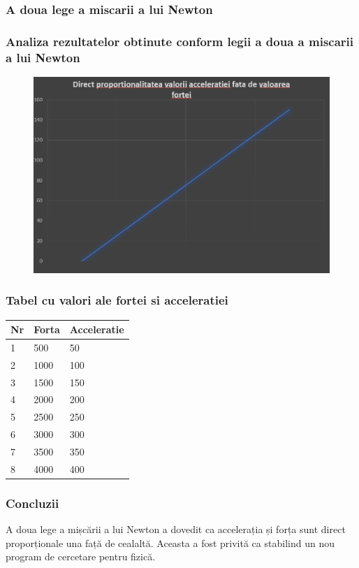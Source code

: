 \documentclass{beamer}
\begin{document}
\begin{frame}
\frametitle{A doua lege a miscarii a lui Newton}
\end{frame}

\begin{frame}
\frametitle{ Analiza rezultatelor obtinute conform legii a doua a miscarii a lui Newton}
\begin{figure}
\includegraphics[width=\textwidth]{Picture1.png}
\end{figure}
\end{frame}

\begin{frame}
\frametitle{Tabel cu valori ale fortei si acceleratiei }
\begin{tabular}{|l|l|l|} \hline
Nr & Forta & Acceleratie \\ \hline
1 & 500 & 50  \\ \hline
2 & 1000 & 100  \\ \hline
3 & 1500 & 150  \\ \hline
4 & 2000 & 200  \\ \hline
5 & 2500 & 250  \\ \hline
6 & 3000 & 300  \\ \hline
7 & 3500 & 350  \\ \hline
8 & 4000 & 400  \\ \hline
\end{tabular}
\end{frame}
\begin{frame}
\frametitle{Concluzii}
A doua lege a mișcării a lui Newton a dovedit ca accelerația și forța sunt direct proporționale una față de cealaltă.
Aceasta a fost privită ca stabilind un nou program de cercetare pentru fizică.

\end{frame}
\end{document}
